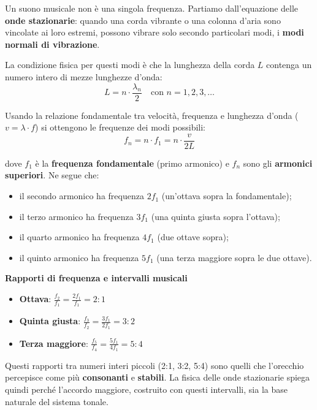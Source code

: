 \begin{fisica}
	\label{phys:serie_armonici_fondamento}

	Un suono musicale non è una singola frequenza. Partiamo dall'equazione delle \textbf{onde stazionarie}: quando una corda vibrante o una colonna d'aria sono vincolate ai loro estremi, possono vibrare solo secondo particolari modi, i \textbf{modi normali di vibrazione}.

	La condizione fisica per questi modi è che la lunghezza della corda $L$ contenga un numero intero di mezze lunghezze d'onda:
	\[
	L = n \cdot \frac{\lambda_n}{2} \quad \text{con } n = 1, 2, 3, \ldots
	\]

	Usando la relazione fondamentale tra velocità, frequenza e lunghezza d'onda ($v = \lambda \cdot f$) si ottengono le frequenze dei modi possibili:
	\[
	f_n = n \cdot f_1 = n \cdot \frac{v}{2L}
	\]

	dove $f_1$ è la \textbf{frequenza fondamentale} (primo armonico) e $f_n$ sono gli \textbf{armonici superiori}. Ne segue che:
	\begin{itemize}
		\item il secondo armonico ha frequenza $2f_1$ (un'ottava sopra la fondamentale);
		\item il terzo armonico ha frequenza $3f_1$ (una quinta giusta sopra l'ottava);
		\item il quarto armonico ha frequenza $4f_1$ (due ottave sopra);
		\item il quinto armonico ha frequenza $5f_1$ (una terza maggiore sopra le due ottave).
	\end{itemize}

	\textbf{Rapporti di frequenza e intervalli musicali}

	\begin{itemize}
		\item \textbf{Ottava}: $\frac{f_2}{f_1} = \frac{2f_1}{f_1} = 2:1$
		\item \textbf{Quinta giusta}: $\frac{f_3}{f_2} = \frac{3f_1}{2f_1} = 3:2$
		\item \textbf{Terza maggiore}: $\frac{f_5}{f_4} = \frac{5f_1}{4f_1} = 5:4$
	\end{itemize}

	Questi rapporti tra numeri interi piccoli (2:1, 3:2, 5:4) sono quelli che l'orecchio percepisce come più \textbf{consonanti} e \textbf{stabili}. La fisica delle onde stazionarie spiega quindi perché l'accordo maggiore, costruito con questi intervalli, sia la base naturale del sistema tonale.


\end{fisica}
